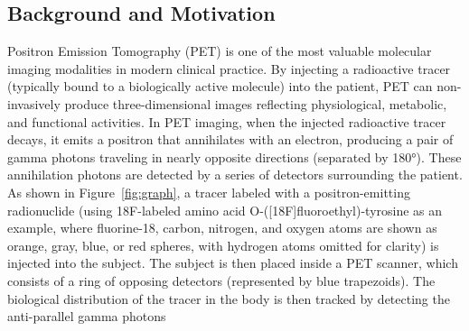 \documentclass[
reprint,
superscriptaddress,
nofootinbib,
amsmath,amssymb,
aps,
prd,
]{revtex4-2}
\begin{document}
\subsection{Background and Motivation}
Positron Emission Tomography (PET) is one of the most valuable molecular imaging modalities in modern clinical practice. By injecting a radioactive tracer (typically bound to a biologically active molecule) into the patient, PET can non-invasively produce three-dimensional images reflecting physiological, metabolic, and functional activities. In PET imaging, when the injected radioactive tracer decays, it emits a positron that annihilates with an electron, producing a pair of gamma photons traveling in nearly opposite directions (separated by 180°). These annihilation photons are detected by a series of detectors surrounding the patient. As shown in Figure~\ref{fig:graph}, a tracer labeled with a positron-emitting radionuclide (using 18F-labeled amino acid O-([18F]fluoroethyl)-tyrosine as an example, where fluorine-18, carbon, nitrogen, and oxygen atoms are shown as orange, gray, blue, or red spheres, with hydrogen atoms omitted for clarity) is injected into the subject. The subject is then placed inside a PET scanner, which consists of a ring of opposing detectors (represented by blue trapezoids). The biological distribution of the tracer in the body is then tracked by detecting the anti-parallel gamma photons\cite{Neumaier}
\end{document}
